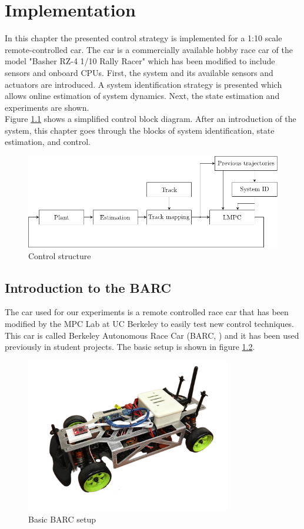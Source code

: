 \chapter{Implementation}
In this chapter the presented control strategy is implemented for a 1:10 scale remote-controlled car. The car is a commercially available hobby race car of the model "Basher RZ-4 1/10 Rally Racer" which has been modified to include sensors and onboard CPUs. First, the system and its available sensors and actuators are introduced. A system identification strategy is presented which allows online estimation of system dynamics. Next, the state estimation and experiments are shown.\\
Figure \ref{fig:controlStructure} shows a simplified control block diagram. After an introduction of the system, this chapter goes through the blocks of system identification, state estimation, and control.
\begin{figure}[ht]
    \centering
  \includegraphics{../../Figures/Illustrator/ControlDiagram.pdf}
    \caption{Control structure}
    \label{fig:controlStructure}
\end{figure}

\section{Introduction to the BARC}
The car used for our experiments is a remote controlled race car that has been modified by the MPC Lab at UC Berkeley to easily test new control techniques. This car is called Berkeley Autonomous Race Car (BARC, \cite{BARC}) and it has been used previously in student projects. The basic setup is shown in figure \ref{fig:BARC}.
\begin{figure}[ht]
    \centering
  \includegraphics[width=0.8\textwidth]{../../Figures/BARC/IMG_1047.pdf}
    \caption{Basic BARC setup}
    \label{fig:BARC}
\end{figure}

